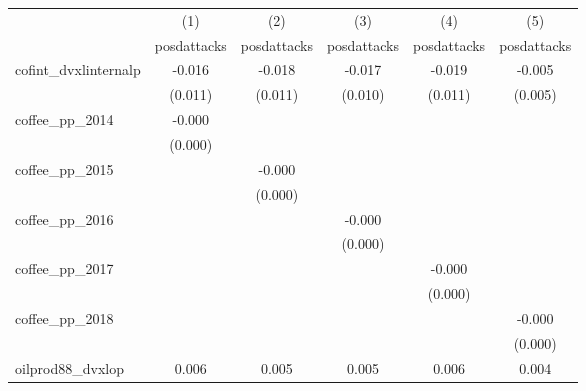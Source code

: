 {
\def\sym#1{\ifmmode^{#1}\else\(^{#1}\)\fi}
\begin{tabular}{l*{5}{c}}
\hline\hline
            &\multicolumn{1}{c}{(1)}&\multicolumn{1}{c}{(2)}&\multicolumn{1}{c}{(3)}&\multicolumn{1}{c}{(4)}&\multicolumn{1}{c}{(5)}\\
            &\multicolumn{1}{c}{posdattacks}&\multicolumn{1}{c}{posdattacks}&\multicolumn{1}{c}{posdattacks}&\multicolumn{1}{c}{posdattacks}&\multicolumn{1}{c}{posdattacks}\\
\hline
cofint\_dvxlinternalp&      -0.016         &      -0.018         &      -0.017         &      -0.019         &      -0.005         \\
            &     (0.011)         &     (0.011)         &     (0.010)         &     (0.011)         &     (0.005)         \\
[1em]
coffee\_pp\_2014&      -0.000         &                     &                     &                     &                     \\
            &     (0.000)         &                     &                     &                     &                     \\
[1em]
coffee\_pp\_2015&                     &      -0.000         &                     &                     &                     \\
            &                     &     (0.000)         &                     &                     &                     \\
[1em]
coffee\_pp\_2016&                     &                     &      -0.000         &                     &                     \\
            &                     &                     &     (0.000)         &                     &                     \\
[1em]
coffee\_pp\_2017&                     &                     &                     &      -0.000         &                     \\
            &                     &                     &                     &     (0.000)         &                     \\
[1em]
coffee\_pp\_2018&                     &                     &                     &                     &      -0.000         \\
            &                     &                     &                     &                     &     (0.000)         \\
[1em]
oilprod88\_dvxlop&       0.006         &       0.005         &       0.005         &       0.006         &       0.004         \\

\end{tabular}}
